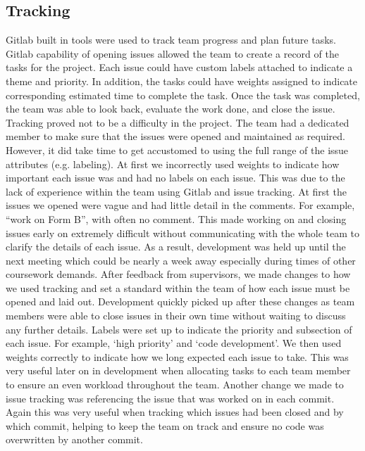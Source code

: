 \documentclass{l3proj}
\begin{document}
\subsection{Tracking}
Gitlab built in tools were used to track team progress and plan future tasks. Gitlab capability of opening issues allowed the team to create a record of the tasks for the project. Each issue could have custom labels attached to indicate a theme and priority. In addition, the tasks could have weights assigned to indicate corresponding estimated time to complete the task. Once the task was completed, the team was able to look back, evaluate the work done, and close the issue.
Tracking proved not to be a difficulty in the project. The team had a dedicated member to make sure that the issues were opened and maintained as required. However, it did take time to get accustomed to using the full range of the issue attributes (e.g. labeling). At first we incorrectly used weights to indicate how important each issue was and had no labels on each issue. This was due to the lack of experience within the team using Gitlab and issue tracking. At first the issues we opened were vague and had little detail in the comments. For example, “work on Form B”, with often no comment. This made working on and closing issues early on extremely difficult without communicating with the whole team to clarify the details of each issue. As a result, development was held up until the next meeting which could be nearly a week away especially during times of other coursework demands. 
After feedback from supervisors, we made changes to how we used tracking and set a standard within the team of how each issue must be opened and laid out. Development quickly picked up after these changes as team members were able to close issues in their own time without waiting to discuss any further details. 
Labels were set up to indicate the priority and subsection of each issue. For example, ‘high priority’ and ‘code development’. We then used weights correctly to indicate how we long expected each issue to take. This was very useful later on in development when allocating tasks to each team member to ensure an even workload throughout the team. Another change we made to issue tracking was referencing the issue that was worked on in each commit. Again this was very useful when tracking which issues had been closed and by which commit, helping to keep the team on track and ensure no code was overwritten by another commit.



\end{document}
